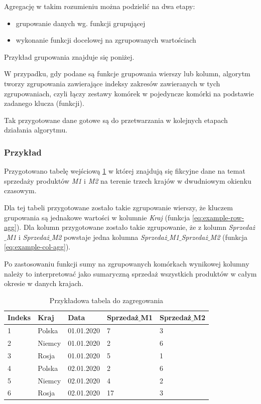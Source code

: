 \documentclass[brudnopis]{xmgr}
\begin{document}
Agregację w takim rozumieniu można podzielić na dwa etapy:
\begin{itemize}
    \item grupowanie danych wg. funkcji grupującej
    \item wykonanie funkcji docelowej na zgrupowanych wartościach
\end{itemize}{}

Przykład grupowania znajduje się poniżej.

W przypadku, gdy podane są funkcje grupowania wierszy lub kolumn, algorytm tworzy zgrupowania zawierające indeksy zakresów zawieranych w tych zgrupowaniach, czyli łączy zestawy komórek w pojedyncze komórki na podstawie zadanego klucza (funkcji).

Tak przygotowane dane gotowe są do przetwarzania w kolejnych etapach działania algorytmu.

\newpage
\subsubsection{Przykład}

Przygotowano tabelę wejściową \ref{tab:example-input} w której znajdują się fikcyjne dane na temat sprzedaży produktów \emph{M1} i \emph{M2} na terenie trzech krajów w dwudniowym okienku czasowym.

Dla tej tabeli przygotowane zostało takie zgrupowanie wierszy, że kluczem grupowania są jednakowe wartości w kolumnie \emph{Kraj} (funkcja \ref{eq:example-row-agg}).
Dla kolumn przygotowane zostało takie zgrupowanie, że z kolumn \emph{Sprzedaż$\_$M1} i \emph{Sprzedaż$\_$M2} powstaje jedna kolumna \emph{Sprzedaż$\_$M1$\_$Sprzedaż$\_$M2} (funkcja \ref{eq:example-col-agg}).

Po zastosowaniu funkcji sumy na zgrupowanych komórkach wynikowej kolumny należy to interpretować jako sumaryczną sprzedaż wszystkich produktów w całym okresie w danych krajach.

\begin{table}[!tbh]
\begin{tabular}{|l|l|l|l|l|} \hline
Indeks & Kraj & Data & Sprzedaż$\_$M1 & Sprzedaż$\_$M2 \\ \hline
1 & Polska & 01.01.2020 & 7 & 3 \\ \hline
2 & Niemcy & 01.01.2020 & 2 & 6 \\ \hline
3 & Rosja & 01.01.2020 & 5 & 1 \\ \hline
4 & Polska & 02.01.2020 & 2 & 6 \\ \hline
5 & Niemcy & 02.01.2020 & 4 & 2 \\ \hline
6 & Rosja & 02.01.2020 & 17 & 3 \\ \hline
\end{tabular}
\caption{Przykładowa tabela do zagregowania \label{tab:example-input}}
\end{table}
\end{document}
